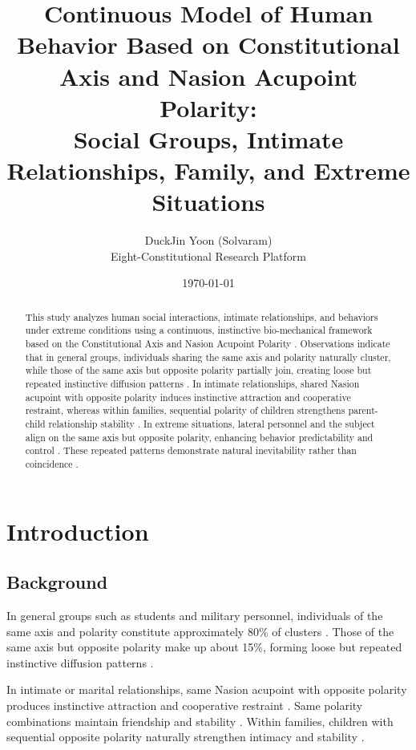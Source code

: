 \documentclass[12pt,a4paper]{article}
\title{Continuous Model of Human Behavior Based on Constitutional Axis and Nasion Acupoint Polarity:\\
Social Groups, Intimate Relationships, Family, and Extreme Situations}
\author{
DuckJin Yoon (Solvaram)\\
Eight-Constitutional Research Platform
}
\date{\today}
\begin{document}
\maketitle

\begin{abstract}
This study analyzes human social interactions, intimate relationships, and behaviors under extreme conditions using a continuous, instinctive bio-mechanical framework based on the Constitutional Axis and Nasion Acupoint Polarity \cite{Yoon2026a,Yoon2026b}. Observations indicate that in general groups, individuals sharing the same axis and polarity naturally cluster, while those of the same axis but opposite polarity partially join, creating loose but repeated instinctive diffusion patterns \cite{Yoon2026c}. In intimate relationships, shared Nasion acupoint with opposite polarity induces instinctive attraction and cooperative restraint, whereas within families, sequential polarity of children strengthens parent-child relationship stability \cite{Yoon2026a}. In extreme situations, lateral personnel and the subject align on the same axis but opposite polarity, enhancing behavior predictability and control \cite{Yoon2026b}. These repeated patterns demonstrate natural inevitability rather than coincidence \cite{Yoon2026c}.
\end{abstract}

\tableofcontents

\vspace{2cm} %

\section{Introduction}
\subsection{Background}
In general groups such as students and military personnel, individuals of the same axis and polarity constitute approximately 80\% of clusters \cite{Yoon2026c}. Those of the same axis but opposite polarity make up about 15\%, forming loose but repeated instinctive diffusion patterns \cite{Yoon2026c}.  

In intimate or marital relationships, same Nasion acupoint with opposite polarity produces instinctive attraction and cooperative restraint \cite{Yoon2026a}. Same polarity combinations maintain friendship and stability \cite{Yoon2026a}. Within families, children with sequential opposite polarity naturally strengthen intimacy and stability \cite{Yoon2026a}.  
\end{document}
